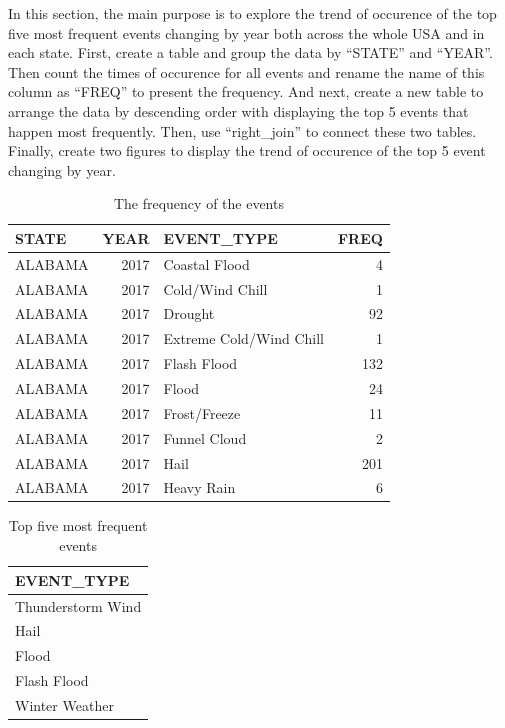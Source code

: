 \documentclass[
]{article}
\begin{document}
In this section, the main purpose is to explore the trend of occurence of the top five most frequent events changing by year both across the whole USA and in each state. First, create a table and group the data by ``STATE'' and ``YEAR''. Then count the times of occurence for all events and rename the name of this column as ``FREQ'' to present the frequency. And next, create a new table to arrange the data by descending order with displaying the top 5 events that happen most frequently. Then, use ``right\_join'' to connect these two tables. Finally, create two figures to display the trend of occurence of the top 5 event changing by year.

\begin{table}[!h]

\caption{\label{tab:tablefrequency}The frequency of the events}
\centering
\begin{tabular}[t]{lrlr}
\toprule
STATE & YEAR & EVENT\_TYPE & FREQ\\
\midrule
ALABAMA & 2017 & Coastal Flood & 4\\
ALABAMA & 2017 & Cold/Wind Chill & 1\\
ALABAMA & 2017 & Drought & 92\\
ALABAMA & 2017 & Extreme Cold/Wind Chill & 1\\
ALABAMA & 2017 & Flash Flood & 132\\
\addlinespace
ALABAMA & 2017 & Flood & 24\\
ALABAMA & 2017 & Frost/Freeze & 11\\
ALABAMA & 2017 & Funnel Cloud & 2\\
ALABAMA & 2017 & Hail & 201\\
ALABAMA & 2017 & Heavy Rain & 6\\
\bottomrule
\end{tabular}
\end{table}

\begin{table}[!h]

\caption{\label{tab:tablefrequencynew}Top five most frequent events}
\centering
\begin{tabular}[t]{l}
\toprule
EVENT\_TYPE\\
\midrule
Thunderstorm Wind\\
Hail\\
Flood\\
Flash Flood\\
Winter Weather\\
\bottomrule
\end{tabular}
\end{table}
\end{document}
